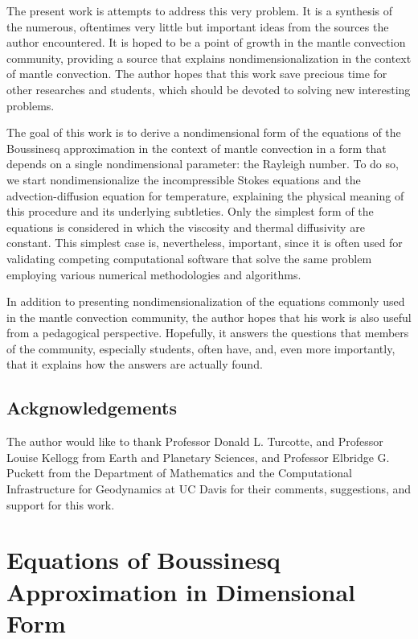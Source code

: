\documentclass[
10pt, %
a4paper, %
oneside, %
headinclude,footinclude, %
BCOR5mm, %
]{scrartcl}
\begin{document}
The present work is attempts to  address this very problem. It is a synthesis of the numerous, oftentimes very little but important ideas from the sources the author encountered. It is hoped to be a point of growth in the mantle convection community, providing a source that explains nondimensionalization in the context of mantle convection. The author hopes that this work save precious time for other researches and students, which should be devoted to solving new interesting problems. 

The goal of this work is to derive a nondimensional form of the equations of the Boussinesq approximation in the context of mantle convection in a form that depends on a single nondimensional parameter: the Rayleigh number. To do so, we start nondimensionalize the incompressible Stokes equations and the advection-diffusion equation for temperature, explaining the physical meaning of this procedure and its underlying subtleties. Only the simplest form of the equations is considered in which the viscosity and thermal diffusivity are constant. This simplest case is, nevertheless, important, since it is often used for validating competing computational software that solve the same problem employing various numerical methodologies and algorithms.

In addition to presenting nondimensionalization of the equations commonly used in the mantle convection community, the author hopes that his work is also useful from a pedagogical perspective. Hopefully, it answers the questions that members of the community, especially students, often have, and, even more importantly, that it explains how the answers are actually found.

\subsection*{Ackgnowledgements} 
The author would like to thank Professor Donald L. Turcotte, and Professor Louise Kellogg from Earth and Planetary Sciences, and Professor Elbridge G. Puckett from the Department of Mathematics and the Computational Infrastructure for Geodynamics at UC Davis for their comments, suggestions, and support for this work.

\newpage

\section{Equations of Boussinesq Approximation in Dimensional Form} \label{parameters}
\end{document}
